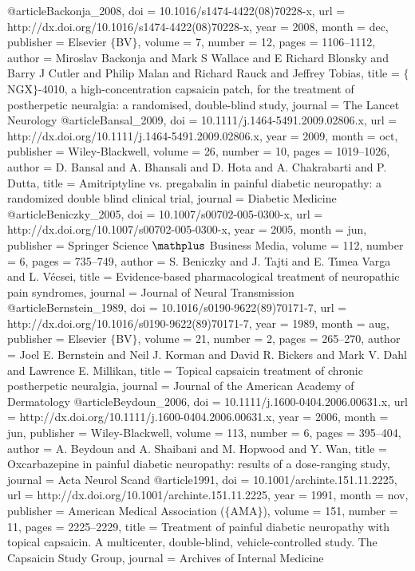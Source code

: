 @article{Backonja_2008,
	doi = {10.1016/s1474-4422(08)70228-x},
	url = {http://dx.doi.org/10.1016/s1474-4422(08)70228-x},
	year = 2008,
	month = {dec},
	publisher = {Elsevier $\lbrace$BV$\rbrace$},
	volume = {7},
	number = {12},
	pages = {1106--1112},
	author = {Miroslav Backonja and Mark S Wallace and E Richard Blonsky and Barry J Cutler and Philip Malan and Richard Rauck and Jeffrey Tobias},
	title = {$\lbrace$NGX$\rbrace$-4010, a high-concentration capsaicin patch, for the treatment of postherpetic neuralgia: a randomised, double-blind study},
	journal = {The Lancet Neurology}
}
@article{Bansal_2009,
	doi = {10.1111/j.1464-5491.2009.02806.x},
	url = {http://dx.doi.org/10.1111/j.1464-5491.2009.02806.x},
	year = 2009,
	month = {oct},
	publisher = {Wiley-Blackwell},
	volume = {26},
	number = {10},
	pages = {1019--1026},
	author = {D. Bansal and A. Bhansali and D. Hota and A. Chakrabarti and P. Dutta},
	title = {Amitriptyline vs. pregabalin in painful diabetic neuropathy: a randomized double blind clinical trial},
	journal = {Diabetic Medicine}
}
@article{Beniczky_2005,
	doi = {10.1007/s00702-005-0300-x},
	url = {http://dx.doi.org/10.1007/s00702-005-0300-x},
	year = 2005,
	month = {jun},
	publisher = {Springer Science $\mathplus$ Business Media},
	volume = {112},
	number = {6},
	pages = {735--749},
	author = {S. Beniczky and J. Tajti and E. T{\'{\i}}mea Varga and L. V{\'{e}}csei},
	title = {Evidence-based pharmacological treatment of neuropathic pain syndromes},
	journal = {Journal of Neural Transmission}
}
@article{Bernstein_1989,
	doi = {10.1016/s0190-9622(89)70171-7},
	url = {http://dx.doi.org/10.1016/s0190-9622(89)70171-7},
	year = 1989,
	month = {aug},
	publisher = {Elsevier $\lbrace$BV$\rbrace$},
	volume = {21},
	number = {2},
	pages = {265--270},
	author = {Joel E. Bernstein and Neil J. Korman and David R. Bickers and Mark V. Dahl and Lawrence E. Millikan},
	title = {Topical capsaicin treatment of chronic postherpetic neuralgia},
	journal = {Journal of the American Academy of Dermatology}
}
@article{Beydoun_2006,
	doi = {10.1111/j.1600-0404.2006.00631.x},
	url = {http://dx.doi.org/10.1111/j.1600-0404.2006.00631.x},
	year = 2006,
	month = {jun},
	publisher = {Wiley-Blackwell},
	volume = {113},
	number = {6},
	pages = {395--404},
	author = {A. Beydoun and A. Shaibani and M. Hopwood and Y. Wan},
	title = {Oxcarbazepine in painful diabetic neuropathy: results of a dose-ranging study},
	journal = {Acta Neurol Scand}
}
@article{1991,
	doi = {10.1001/archinte.151.11.2225},
	url = {http://dx.doi.org/10.1001/archinte.151.11.2225},
	year = 1991,
	month = {nov},
	publisher = {American Medical Association ($\lbrace$AMA$\rbrace$)},
	volume = {151},
	number = {11},
	pages = {2225--2229},
	title = {Treatment of painful diabetic neuropathy with topical capsaicin. A multicenter, double-blind, vehicle-controlled study. The Capsaicin Study Group},
	journal = {Archives of Internal Medicine}
}
